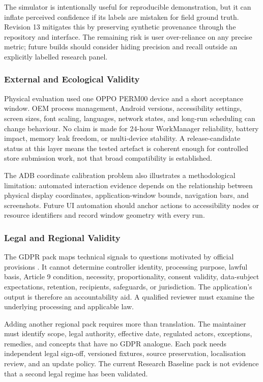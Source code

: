 The simulator is intentionally useful for reproducible demonstration, but it can inflate perceived confidence if its labels are mistaken for field ground truth. Revision 13 mitigates this by preserving synthetic provenance through the repository and interface. The remaining risk is user over-reliance on any precise metric; future builds should consider hiding precision and recall outside an explicitly labelled research panel.

\subsubsection{External and Ecological Validity}

Physical evaluation used one OPPO PERM00 device and a short acceptance window. OEM process management, Android versions, accessibility settings, screen sizes, font scaling, languages, network states, and long-run scheduling can change behaviour. No claim is made for 24-hour WorkManager reliability, battery impact, memory leak freedom, or multi-device stability. A release-candidate status at this layer means the tested artefact is coherent enough for controlled store submission work, not that broad compatibility is established.

The ADB coordinate calibration problem also illustrates a methodological limitation: automated interaction evidence depends on the relationship between physical display coordinates, application-window bounds, navigation bars, and screenshots. Future UI automation should anchor actions to accessibility nodes or resource identifiers and record window geometry with every run.

\subsubsection{Legal and Regional Validity}

The GDPR pack maps technical signals to questions motivated by official provisions \cite{eurlex2016}. It cannot determine controller identity, processing purpose, lawful basis, Article 9 condition, necessity, proportionality, consent validity, data-subject expectations, retention, recipients, safeguards, or jurisdiction. The application's output is therefore an accountability aid. A qualified reviewer must examine the underlying processing and applicable law.

Adding another regional pack requires more than translation. The maintainer must identify scope, legal authority, effective date, regulated actors, exceptions, remedies, and concepts that have no GDPR analogue. Each pack needs independent legal sign-off, versioned fixtures, source preservation, localisation review, and an update policy. The current Research Baseline pack is not evidence that a second legal regime has been validated.

